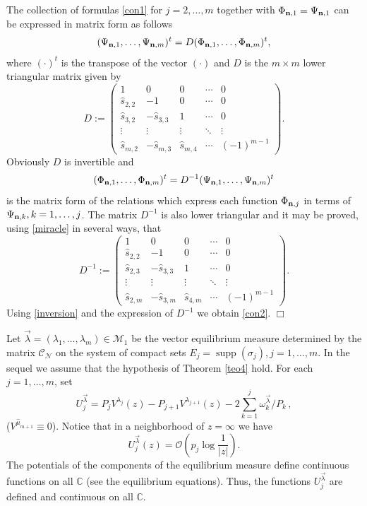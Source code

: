 \documentclass{amsart}
\theoremstyle{definition}
\theoremstyle{remark}
\newcommand{\supp}{\operatorname{supp }}
\begin{document}
The collection of formulas \eqref{con1} for $j=2,\ldots,m$ together with $\Phi_{{\bf n},1} = \Psi_{{\bf n},1}$ can be expressed in matrix form as follows
\[ (\Psi_{{\bf n},1},\ldots,\Psi_{{\bf n},m})^t = D (\Phi_{{\bf n},1},\ldots,\Phi_{{\bf n},m})^t,
\]
where $(\cdot)^t$ is the transpose of the vector $(\cdot)$ and $D$ is the $m\times m$ lower triangular matrix given by
\[ D :=
\left(
\begin{array}{ccccc}
1 & 0 & 0 & \cdots & 0 \\
\widehat{s}_{2,2} & -1 & 0 & \cdots & 0 \\
\widehat{s}_{3,2} & - \widehat{s}_{3,3} & 1 & \cdots & 0 \\
\vdots & \vdots & \vdots & \ddots & \vdots \\
\widehat{s}_{m,2} & - \widehat{s}_{m,3} & \widehat{s}_{m,4} & \cdots & (-1)^{m-1}
\end{array}
\right).
\]
Obviously $D$ is invertible and
\begin{equation} \label{inversion} (\Phi_{{\bf n},1},\ldots,\Phi_{{\bf n},m})^t = D^{-1} (\Psi_{{\bf n},1},\ldots,\Psi_{{\bf n},m})^t
\end{equation}
is the matrix form of the relations which express each function $\Phi_{{\bf n},j}$ in terms of $\Psi_{{\bf n},k}, k=1,\ldots,j$.
The matrix $D^{-1}$ is also lower triangular and it may be proved, using \eqref{miracle} in several ways, that
\[ D^{-1} :=
\left(
\begin{array}{ccccc}
1 & 0 & 0 & \cdots & 0 \\
\widehat{s}_{2,2} & -1 & 0 & \cdots & 0 \\
\widehat{s}_{2,3} & - \widehat{s}_{3,3} & 1 & \cdots & 0 \\
\vdots & \vdots & \vdots & \ddots & \vdots \\
\widehat{s}_{2,m} & - \widehat{s}_{3,m} & \widehat{s}_{4,m} & \cdots & (-1)^{m-1}
\end{array}
\right).
\]
Using \eqref{inversion} and the expression of $D^{-1}$ we obtain \eqref{con2}. \hfill $\Box$

\medskip

Let $\vec{\lambda} = (\lambda_1,\ldots,\lambda_m) \in
\mathcal{M}_1$ be the vector equilibrium measure determined by the
matrix $\mathcal{C}_{\mathcal{N}}$ on the system of compact
sets $E_j = \supp(\sigma_j), j=1,\ldots,m$. In the sequel we assume that the hypothesis of Theorem \ref{teo4} hold. For each $j=1, \ldots, m$, set
\[
U_j^{\vec{\lambda}}=P_j V^{{\lambda}_{j}}(z)- P_{j+1}V^{ {\lambda}_{j+1}}(z)-2 \sum_{k=1}^{j}
{\omega_k^{\vec{\lambda}}/P_k}\,,
\]
($V^{\widehat{\mu}_{m+1}} \equiv 0 $). Notice that in a
neighborhood of $z=\infty$ we have
\[
U^{\vec{\lambda}}_j(z) =  {\mathcal{O}}\left(p_{j} \log
\frac{1}{|z|}\right).
\]
The potentials of the components of the equilibrium measure  define continuous functions on all $\mathbb{C}$ (see the equilibrium equations). Thus, the functions $U^{\vec{\lambda}}_j$ are defined and continuous on all $\mathbb{C}$.
\end{document}
